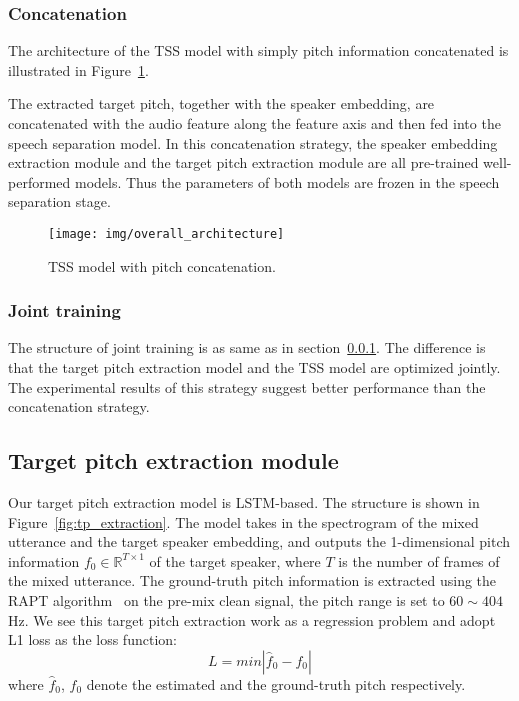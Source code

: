 \documentclass[
]{article}
\begin{document}
    \subsubsection{Concatenation}
    \label{subsubsec:pitch_cat}
    The architecture of the TSS model with simply pitch information concatenated is illustrated in Figure~\ref{fig:pitch_concatenate}.

    The extracted target pitch, together with the speaker embedding, are concatenated with the audio feature along the feature axis and then fed into the speech separation model. In this concatenation strategy, the speaker embedding extraction module and the target pitch extraction module are all pre-trained well-performed models. Thus the parameters of both models are frozen in the speech separation stage.

    \begin{figure}[t]
        \centering
        \texttt{[image: img/overall\_architecture]}
        \caption{TSS model with pitch concatenation.}
        \label{fig:pitch_concatenate}
    \end{figure}

    \subsubsection{Joint training}
    \label{subsubsec:pitch_joint}

    The structure of joint training is as same as in section~\ref{subsubsec:pitch_cat}.
    The difference is that the target pitch extraction model and the TSS model are optimized jointly. The experimental results of this strategy suggest better performance than the concatenation strategy.

    \subsection{Target pitch extraction module}
    \label{subsec:pitch_model}
    Our target pitch extraction model is LSTM-based. The structure is shown in Figure~\ref{fig:tp_extraction}.
    The model takes in the spectrogram of the mixed utterance and the target speaker embedding, and outputs the 1-dimensional pitch information $f_0\in\mathbb{R}^{T\times 1}$ of the target speaker, where $T$ is the number of frames of the mixed utterance.
    The ground-truth pitch information is extracted using the RAPT algorithm~\cite{Talkin2005ARA} on the pre-mix clean signal, the pitch range is set to $60\sim404$ Hz.
    We see this target pitch extraction work as a regression problem and adopt L1 loss as the loss function:
    \begin{equation}
        L = min|\hat{f}_{0}-f_{0}|
    \end{equation}
    where $\hat{f}_{0}$, $f_{0}$ denote the estimated and the ground-truth pitch respectively.
\end{document}
